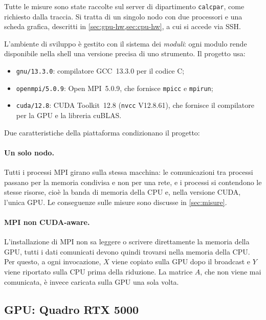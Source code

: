 \documentclass[11pt,a4paper]{article}
\begin{document}
Tutte le misure sono state raccolte sul server di dipartimento
\texttt{calcpar}, come richiesto dalla traccia. Si tratta di un singolo nodo
con due processori e una scheda grafica, descritti in
\cref{sec:gpu-hw,sec:cpu-hw}, a cui si accede via SSH.

L'ambiente di sviluppo è gestito con il sistema dei \emph{moduli}: ogni modulo
rende disponibile nella shell una versione precisa di uno strumento. Il
progetto usa:
\begin{itemize}
  \item \texttt{gnu/13.3.0}: compilatore GCC~13.3.0 per il codice C;
  \item \texttt{openmpi/5.0.9}: Open MPI~5.0.9, che fornisce \texttt{mpicc}
        e \texttt{mpirun};
  \item \texttt{cuda/12.8}: CUDA Toolkit~12.8 (\texttt{nvcc} V12.8.61), che
        fornisce il compilatore per la GPU e la libreria cuBLAS.
\end{itemize}

Due caratteristiche della piattaforma condizionano il progetto:

\paragraph{Un solo nodo.} Tutti i processi MPI girano sulla stessa macchina:
le comunicazioni tra processi passano per la memoria condivisa e non per una
rete, e i processi si contendono le stesse risorse, cioè la banda di memoria
della CPU e, nella versione CUDA, l'unica GPU. Le conseguenze sulle misure
sono discusse in \cref{sec:misure}.

\paragraph{MPI non CUDA-aware.} L'installazione di MPI non sa leggere o
scrivere direttamente la memoria della GPU, tutti i dati comunicati
devono quindi trovarsi nella memoria della CPU. Per questo, a ogni
invocazione, $X$ viene copiato sulla GPU dopo il broadcast e $Y$ viene
riportato sulla CPU prima della riduzione. La matrice
$A$, che non viene mai comunicata, è invece caricata sulla GPU una sola volta.

\subsection{GPU: Quadro RTX 5000}\label{sec:gpu-hw}
\end{document}
